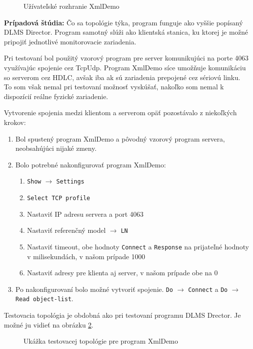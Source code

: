 \begin{figure}[h]
    \centering
    \caption{Užívateľské rozhranie XmlDemo}
\label{XmlDemo-term}
\end{figure} \par
\noindent \textbf{Prípadová štúdia:} Čo sa topológie týka, program funguje ako vyššie popísaný DLMS Director. Program samotný slúži ako klientská stanica, ku ktorej je možné pripojiť jednotlivé monitorovacie zariadenia. \par
Pri testovaní bol použitý vzorový program pre server komunikujúci na porte 4063 využívajúc spojenie cez TcpUdp. Program XmlDemo síce umožňuje komunikáciu so serverom cez HDLC, avšak iba ak sú zariadenia prepojené cez sériovú linku. To som však nemal pri testovaní možnosť vyskúšať, nakoľko som nemal k dispozícií reálne fyzické zariadenie. \par
Vytvorenie spojenia medzi klientom a serverom opäť pozostávalo z niekoľkých krokov:
\begin{enumerate}
\item Bol spustený program XmlDemo a pôvodný vzorový program servera, neobsahújúci nijaké zmeny. 
\item Bolo potrebné nakonfigurovať program XmlDemo:
\begin{enumerate}
\item {\tt Show} $\rightarrow$ {\tt Settings}
\item {\tt Select TCP profile}
\item Nastaviť IP adresu servera a port 4063
\item Nastaviť referenčný model $\rightarrow$ {\tt LN}
\item Nastaviť timeout, obe hodnoty {\tt Connect} a {\tt Response} na prijateľné hodnoty v milisekundách, v našom prípade 1000
\item Nastaviť adresy pre klienta aj server, v našom prípade obe na 0
\end{enumerate}
\item Po nakonfigurovaní bolo možné vytvoriť spojenie. {\tt Do} $\rightarrow$ {\tt Connect} a {\tt Do} $\rightarrow$ {\tt Read object-list}.
\end{enumerate} \par
Testovacia topológia je obdobná ako pri testovaní programu DLMS Drector. Je možné ju vidieť na obrázku \ref{xmldemotopology}.
\begin{figure}[h]
    \centering
    \caption{Ukážka testovacej topológie pre program XmlDemo}
\label{xmldemotopology}
\end{figure}
